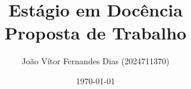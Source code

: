 \documentclass[12pt, a4paper]{article}
\title{\textbf{Estágio em Docência \\ Proposta de Trabalho}}
\author{João Vítor Fernandes Dias (2024711370)}
\date{\today}
\begin{document}
\begin{comment}

## Moodle

- Enviar a proposta de trabalho no formato PDF pelo Moodle com o nome `<NomeDoAluno>.pdf`
- Ao enviar a proposta, o aluno deve também encaminhar uma mensagem ao coordenador da disciplina por e-mail, incluindo o professor responsável pela disciplina em cópia, de modo a informá-lo da submissão da proposta. A proposta de trabalho será avaliada pelo coordenador da disciplina, compondo a nota final da disciplina ED I/II.

===

## Diretrizes Gerais:

4. Proposta de trabalho: é definida uma data para que o estagiário encaminhe uma proposta de trabalho ao coordenador da disciplina, em que conste também o tipo de atividade a ser conduzida, em comum acordo com o professor responsável pela turma à qual foi alocado.

---

A proposta de trabalho deverá ser previamente acertada com o professor responsável pela turma à qual o estagiário foi alocado, e submetida no Moodle da disciplina em um arquivo PDF (usar o nome NomeCompletoDoAluno.pdf).

A proposta deve conter os seguintes itens:

1. Identificação: Título, Disciplina, Professor responsável pela turma
2. Sobre a Disciplina: Descrição da forma de condução da disciplina adotada pelo professor responsável. Ementa e programa da disciplina. Bibliografia adotada. Formas de avaliação.
3. Atividades: Indicação das atividades e tarefas que ficarão sob a responsabilidade do estagiário.
4. Cronograma: Cronograma de aulas e avaliações, indicando a participação do estagiário ao longo do tempo.

Ao enviar a proposta, o aluno deve também encaminhar uma mensagem ao coordenador da disciplina por e-mail, incluindo o professor responsável pela disciplina em cópia, de modo a informá-lo da submissão da proposta.

A proposta de trabalho será avaliada pelo coordenador da disciplina, compondo a nota final da disciplina ED I/II.

---

### Critérios de Avaliação

A avaliação será feita considerando o planejamento e as atividades realizadas ao longo do semestre. Os critérios são os seguintes:

- Proposta de trabalho: 50 pontos (coordenador da disciplina ED)
  - Conhecimento da disciplina apoiada
  - Planejamento das atividades
  - Atendimento ao conteúdo previsto
\end{comment}
\end{document}

